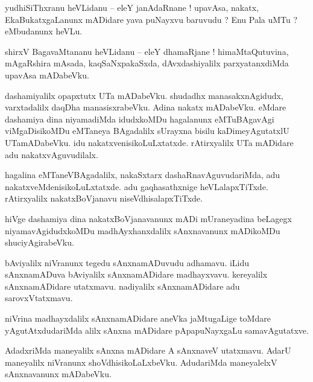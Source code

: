 \documentclass{article}
\begin{document}
\begin{mn}%
yudhiSiThxranu heVLidanu -- eleY janAdaRnane ! upavAsa, nakatx, EkaBukatxgaLanunx mADidare yava 
puNayxvu baruvudu ? Enu Pala uMTu ? eMbudanunx heVLu.
\end{mn}

\begin{mn}%
shirxV BagavaMtananu heVLidanu -- eleY dhamaRjane ! himaMtaQutuvina, mAgaRshira mAsada, 
kaqSaNxpakaSxda, dAvxdashiyalilx parxyatanxdiMda upavAsa mADabeVku.
\end{mn}

\begin{mn}%
dashamiyalilx opapxtutx UTa mADabeVku. shudadhx manasakxnAgidudx, varxtadalilx daqDha 
manasisxrabeVku. Adina nakatx mADabeVku. eMdare dashamiya dina niyamadiMda idudxkoMDu hagalanunx 
eMTuBAgavAgi viMgaDisikoMDu eMTaneya BAgadalilx sUrayxna bisilu kaDimeyAgutatxlU UTamADabeVku. idu 
nakatxvenisikoLuLxtatxde. rAtirxyalilx UTa mADidare adu nakatxvAguvudilalx.
\end{mn}

\begin{mn}%
hagalina eMTaneVBAgadalilx, nakaSxtarx dashaRnavAguvudariMda, adu nakatxveMdenisikoLuLxtatxde. adu 
gaqhasathxnige heVLalapxTiTxde. rAtirxyalilx nakatxBoVjanavu niseVdhisalapxTiTxde.
\end{mn}

\begin{mn}%
hiVge dashamiya dina nakatxBoVjanavanunx mADi mUraneyadina beLagegx niyamavAgidudxkoMDu 
madhAyxhanxdalilx sAnxnavanunx mADikoMDu shuciyAgirabeVku.
\end{mn}

\begin{mn}%
bAviyalilx niVranunx tegedu sAnxnamADuvudu adhamavu. iLidu sAnxnamADuva bAviyalilx sAnxnamADidare 
madhayxvavu. kereyalilx sAnxnamADidare utatxmavu. nadiyalilx sAnxnamADidare adu sarovxVtatxmavu.
\end{mn}

\begin{mn}%
niVrina madhayxdalilx sAnxnamADidare aneVka jaMtugaLige toMdare yAgutAtxdudariMda alilx sAnxna 
mADidare pApapuNayxgaLu samavAgutatxve.
\end{mn}

\begin{mn}%
AdadxriMda maneyalilx sAnxna mADidare A sAnxnaveV utatxmavu. AdarU maneyalilx niVranunx 
shoVdhisikoLaLxbeVku. AdudariMda maneyalelxV sAnxnavanunx mADabeVku.
\end{mn}
\end{document}
